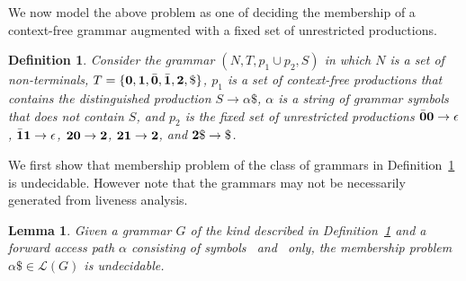 \documentclass[preprint, 9pt]{sigplanconf}
\newtheorem{proposition}[theorem]{Proposition}
\newtheorem{definition}[theorem]{Definition}
\newtheorem{lemma}[theorem]{Lemma}
\begin{document}
We now model  the above problem as one  of deciding the
membership of  a context-free grammar augmented  with a
fixed set of unrestricted productions.

\begin{definition}\label{def:specialgrammar}
Consider the  grammar $(N,T,  p_1\cup p_2,S)$  in which
$N$ is  a set  of non-terminals,  $T =  \{\mathbf{0}, \mathbf{1},
\bar{\mathbf{0}},  \bar{\mathbf{1}},  {\mathbf{2}},  \$\}$,   $p_1$  is  a  set  of
context-free    productions     that    contains    the
distinguished  production   $S  \rightarrow  \alpha\$$,
$\alpha$ is a  string of grammar symbols  that does not
contain $S$, and $p_2$ is the fixed set of unrestricted
productions    $\bar{\mathbf{0}}\mathbf{0}    \rightarrow    \epsilon$,
$\bar{\mathbf{1}}\mathbf{1}    \rightarrow   \epsilon$,    ${\mathbf{2}}\mathbf{0}
\rightarrow {\mathbf{2}}$,  ${\mathbf{2}}\mathbf{1} \rightarrow {\mathbf{2}}$,
and $\clazy\$ \rightarrow \$ $.
\end{definition}

We first show that membership problem of the class of grammars in
Definition~\ref{def:specialgrammar} is undecidable. However note that
the grammars may not be necessarily generated from liveness analysis.
\newcommand{\state}{\ensuremath{\mathsf{S}}}
\newcommand{\nont}[2]{\ensuremath{\mathsf{S}_{#1}^{#2}}}  
\begin{lemma}\label{lemma:grammar-undecidable}
Given a grammar    $G$    of   the    kind    described    in
Definition~\ref{def:specialgrammar}  and a forward access path $\alpha$
consisting  of symbols \acar\  and \acdr\  only, the membership problem
$\alpha\$ \in \mathscr{L}(G)$ is undecidable.
\end{lemma} 
\end{document}

